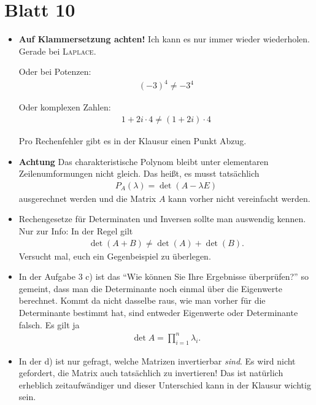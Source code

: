 \documentclass[11pt, a4paper]{article}
\begin{document}
\section*{Blatt 10}
\begin{itemize}
\item \textbf{Auf Klammersetzung achten!} Ich kann es nur immer wieder wiederholen. Gerade bei \textsc{Laplace}. 

Oder bei Potenzen:
\begin{align*}
(-3)^4 \neq -3^4
\end{align*}

Oder komplexen Zahlen:
\begin{align*}
1 + 2i\cdot 4 \neq (1 + 2i)\cdot 4
\end{align*}

Pro Rechenfehler gibt es in der Klausur einen Punkt Abzug. 

\item \textbf{Achtung} Das charakteristische Polynom bleibt unter elementaren Zeilenumformungen nicht gleich. Das heißt, es musst tatsächlich
\begin{align*}
P_A(\lambda) = \det(A - \lambda E)
\end{align*}
ausgerechnet werden und die Matrix $A$ kann vorher nicht vereinfacht werden.

\item Rechengesetze für Determinaten und Inversen sollte man auswendig kennen. Nur zur Info: In der Regel gilt
\begin{align*}
\det(A + B) \neq \det(A) + \det(B).
\end{align*}
Versucht mal, euch ein Gegenbeispiel zu überlegen.

\item In der Aufgabe 3 c) ist das \enquote{Wie können Sie Ihre Ergebnisse überprüfen?} so gemeint, dass man die Determinante noch einmal über die Eigenwerte berechnet. Kommt da nicht dasselbe raus, wie man vorher für die Determinante bestimmt hat, sind entweder Eigenwerte oder Determinante falsch. Es gilt ja
\begin{align*}
\det A = \prod_{i=1}^n \lambda_i.
\end{align*}

\item In der d) ist nur gefragt, welche Matrizen invertierbar \emph{sind}. Es wird nicht gefordert, die Matrix auch tatsächlich zu invertieren! Das ist natürlich erheblich zeitaufwändiger und dieser Unterschied kann in der Klausur wichtig sein. 


\end{itemize}
\end{document}
